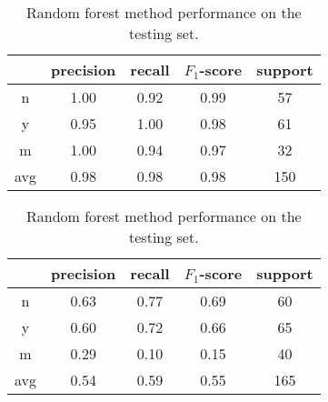 \documentclass[11pt]{article}
\begin{document}
\begin{table}
  \centering
  \begin{tabular}[!htbp]{c|c c c c}
       & precision &recall &$F_1$-score &support \\ \hline
    n  & 1.00      &0.92   &0.99     &57      \\
    y  & 0.95      &1.00   &0.98     &61      \\
    m  & 1.00      &0.94   &0.97     &32      \\ \hline
    avg& 0.98      &0.98   &0.98     &150     \\
  \end{tabular}
  \caption{Reconstructing the training set with random forest classification method.}

  \begin{tabular}[!htbp]{c|c c c c}
       & precision &recall &$F_1$-score &support \\ \hline
    n  & 0.63      &0.77   &0.69     &60      \\
    y  & 0.60      &0.72   &0.66     &65      \\
    m  & 0.29      &0.10   &0.15     &40      \\ \hline
    avg& 0.54      &0.59   &0.55     &165     \\
  \end{tabular}
  \caption{Random forest method performance on the testing set.}
\end{table}
\end{document}
